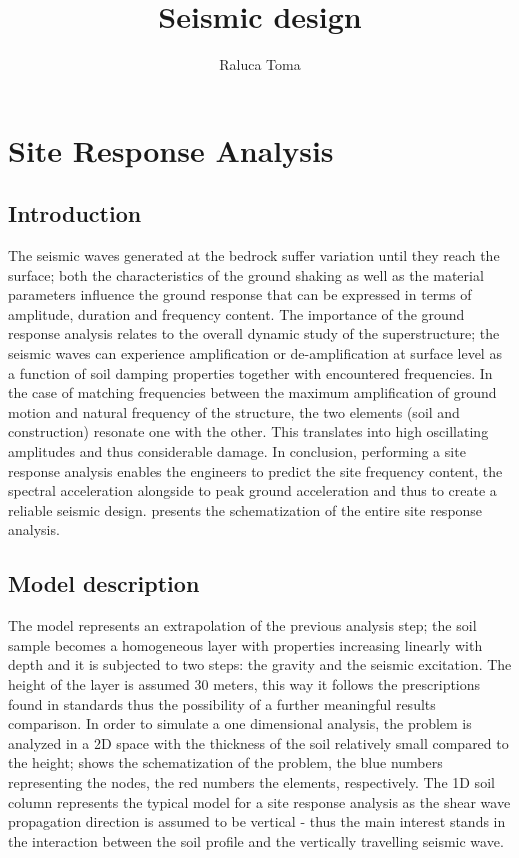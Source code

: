 \documentclass[10pt,a4paper]{report}
\title{Seismic design}
\author{Raluca Toma}
\begin{document}

	\chapter {Site Response Analysis}
		\section{Introduction}
The seismic waves generated at the bedrock suffer variation until they reach the surface; both the characteristics of the ground shaking as well as the material parameters influence the ground response that can be expressed in terms of amplitude, duration and frequency content. The importance of the ground response analysis relates to the overall dynamic study of the superstructure; the seismic waves can experience amplification or de-amplification at surface level as a function of soil damping properties together with encountered frequencies. In the case of matching frequencies between the maximum amplification of ground motion and natural frequency of the structure, the two elements (soil and construction) resonate one with the other. This translates into high oscillating amplitudes and thus considerable damage. In conclusion, performing a site response analysis enables the engineers to predict the site frequency content, the spectral acceleration alongside to peak ground acceleration and thus to create a reliable seismic design. \label{Figure 1}presents the schematization of the entire site response analysis.
	
		
		\section{Model description}
The model represents an extrapolation of the previous analysis step; the soil sample becomes a homogeneous layer with properties increasing linearly with depth and it is subjected to two steps: the gravity and the seismic excitation. The height of the layer is assumed 30 meters, this way it follows the prescriptions found in standards thus the possibility of a further meaningful results comparison. In order to simulate a one dimensional analysis, the problem is analyzed in a 2D space with the thickness of the soil relatively small compared to the height; \label{fig:Soilcolumn} shows the schematization of the problem, the blue numbers representing the nodes, the red numbers the elements, respectively. The 1D soil column represents the typical model for a site response analysis as the shear wave propagation direction is assumed to be vertical - thus the main interest stands in the interaction between the soil profile and the vertically travelling seismic wave. 
\end{document}
